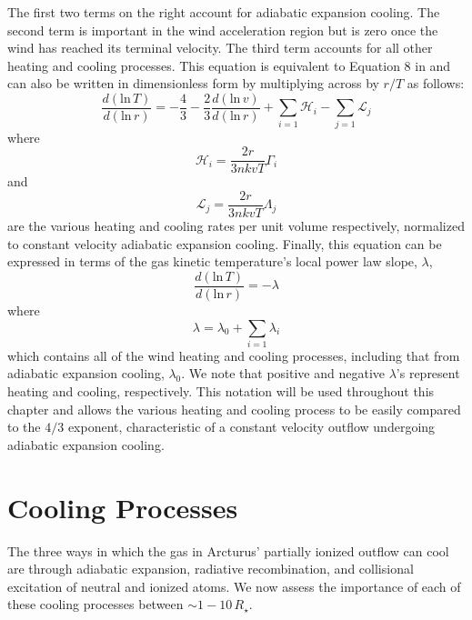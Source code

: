 The first two terms on the right account for adiabatic expansion cooling. The second term is important in the wind acceleration region but is zero once the wind has reached its terminal velocity. The third term accounts for all other heating and cooling processes. This equation is equivalent to Equation 8 in \cite{goldreich_1976} and can also be written in dimensionless form \citep{rodgers_1991} by multiplying across by $r/T$ as follows:
\begin{equation} 
\label{eq:7.8}
\frac{d(\mathrm{ln}\,T)}{d(\mathrm{ln}\,r)}=-\frac{4}{3}-\frac{2}{3}\frac{d(\mathrm{ln}\,v)}{d(\mathrm{ln}\,r)}+\displaystyle\sum_{i=1}\mathcal{H}_{i}-\displaystyle\sum_{j=1}\mathcal{L}_{j}
\end{equation} 
where 
\begin{equation}
\mathcal{H}_{i}=\frac{2r}{3nkvT}\Gamma_{i} 
\end{equation} 
and 
\begin{equation}
\label{eq:1.10}
\mathcal{L}_{j}=\frac{2r}{3nkvT}\Lambda_{j}
\end{equation} 
are the various heating and cooling rates per unit volume respectively, normalized to constant velocity adiabatic expansion cooling. Finally, this equation can be expressed in terms of the gas kinetic temperature's local power law slope, $\lambda$, 
\begin{equation} \label{eq:lambda}
\frac{d(\mathrm{ln}\,T)}{d(\mathrm{ln}\,r)}=-\lambda
\end{equation}
where 
\begin{equation}
\lambda =\lambda_{0}+\displaystyle\sum_{i=1}\lambda_{i}
\end{equation} 
which contains all of the wind heating and cooling processes, including that from adiabatic expansion cooling, $\lambda_{0}$. We note that positive and negative $\lambda$'s represent heating and cooling, respectively. This notation will be used throughout this chapter and allows the various heating and cooling process to be easily compared to the $4/3$ exponent, characteristic of a constant velocity outflow undergoing adiabatic expansion cooling.

\section{Cooling Processes}\label{sec:7.3}
The three ways in which the gas in Arcturus' partially ionized outflow can cool are through adiabatic expansion, radiative recombination, and collisional excitation of neutral and ionized atoms. We now assess the importance of each of these cooling processes between $\sim 1-10\,R_{\star}$. 

